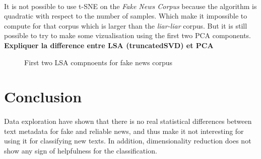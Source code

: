 \paragraph{} It is not possible to use t-SNE on the \textit{Fake News Corpus} because the algorithm is quadratic with respect to the number of samples. Which make it impossible to compute for that corpus which is larger than the \textit{liar-liar} corpus. But it is still possible to try to make some vizualisation using the first two PCA components.  \textbf{Expliquer la difference entre LSA (truncatedSVD) et PCA}

\begin{figure}[h]
  \centering
  \caption{First two LSA compnoents for fake news corpus}
  \label{fig:data_explo:LSA1}
\end{figure}

\section{Conclusion}
\paragraph{} Data exploration have shown that there is no real statistical differences between text metadata for fake and reliable news, and thus make it not interesting for using it for classifying new texts. In addition, dimensionality reduction does not show any sign of helpfulness for the classification. 
